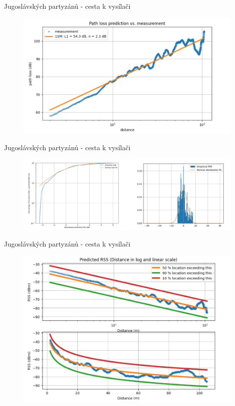 \documentclass[aspectratio=169, 12pt, hyperref={unicode}]{beamer}
\begin{document}
	\begin{frame}{Jugoslávských partyzánů - cesta k vysílači}
		\begin{figure}[!ht]
			\centering
			\includegraphics[width=.75\textwidth]{src/partyzanu-k-vysilaci-1.png}
		\end{figure}
	\end{frame}
	\begin{frame}{Jugoslávských partyzánů - cesta k vysílači}
		\begin{figure}[!ht]
			\centering
			\includegraphics[width=\textwidth]{src/partyzanu-k-vysilaci-2.png}
		\end{figure}
	\end{frame}
	\begin{frame}{Jugoslávských partyzánů - cesta k vysílači}
		\begin{figure}[!ht]
			\centering
			\includegraphics[width=.6\textwidth]{src/partyzanu-k-vysilaci-3.png}
		\end{figure}
	\end{frame}
\end{document}
